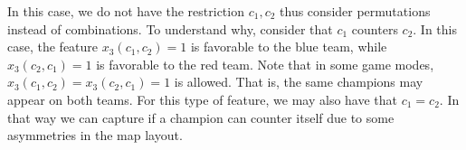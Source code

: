 In this case, we do not have the restriction $c_1, c_2$ thus consider permutations instead of combinations.
To understand why, consider that $c_1$ counters $c_2$.
In this case, the feature $x_3(c_1, c_2) = 1$ is favorable to the blue team, while $x_3(c_2, c_1) = 1$ is favorable to the red team.
Note that in some game modes, $x_3(c_1, c_2) = x_3(c_2, c_1) = 1$ is allowed. That is, the same champions may appear on both teams.
For this type of feature, we may also have that $c_1 = c_2$.
In that way we can capture if a champion can counter itself due to some asymmetries in the map layout.

